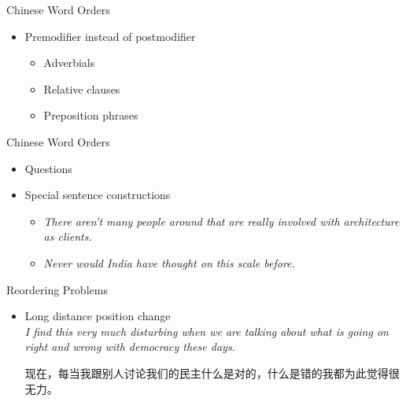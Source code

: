 \documentclass[18pt]{beamer}
\newcommand{\cntext}[1]{\begin{CJK}{UTF8}{gbsn}#1\end{CJK}}
\begin{document}
\begin{frame}{Chinese Word Orders}
\begin{itemize}
\item Premodifier instead of postmodifier
\begin{itemize}
	\item Adverbials
	\item Relative clauses
	\item Preposition phrases
\end{itemize}	
\end{itemize}
\begin{figure}
\centering

\end{figure}
\end{frame}

\begin{frame}{Chinese Word Orders}
\begin{itemize}
\item Questions
\begin{figure}
\centering

\end{figure}
\item Special sentence constructions
\begin{itemize}
\item \textit{\alert{There aren't} many people around that are really involved with architecture as clients.}
\item \textit{\alert{Never would} India have thought on this scale before.}
\end{itemize}
\end{itemize}
\end{frame}

\begin{frame}{Reordering Problems}
\begin{itemize}
\item Long distance position change \\ \bigskip
\textit{I find this very much disturbing \alert{when we are talking about what is going on right and wrong with democracy these days}.}\\ \bigskip
\cntext{\alert{现在，每当我跟别人讨论我们的民主什么是对的，什么是错的}我都为此觉得很无力。}
\end{itemize}
\end{frame}
\end{document}
